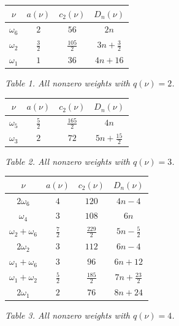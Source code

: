 \documentclass[11pt,reqno]{amsart}
\renewcommand{\arraystretch}{1.32}
\theoremstyle{definition}
\theoremstyle{remark}
\begin{document}
\begin{center}
\renewcommand{\arraystretch}{1.18}
\begin{tabular}{c|c|c|c}
$\nu$ & $a(\nu)$ & $c_2(\nu)$ & $D_n(\nu)$\\
\hline
$\omega_6$ & $2$ & $56$ & $2n$\\
$\omega_2$ & $\frac32$ & $\frac{105}{2}$
  & $3n+\frac32$\\
$\omega_1$ & $1$ & $36$ & $4n+16$
\end{tabular}
\par\smallskip
\textit{Table 1. All nonzero weights with $q(\nu)=2$.}
\end{center}

\begin{center}
\renewcommand{\arraystretch}{1.18}
\begin{tabular}{c|c|c|c}
$\nu$ & $a(\nu)$ & $c_2(\nu)$ & $D_n(\nu)$\\
\hline
$\omega_5$ & $\frac52$ & $\frac{165}{2}$ & $4n$\\
$\omega_3$ & $2$ & $72$ & $5n+\frac{15}{2}$
\end{tabular}
\par\smallskip
\textit{Table 2. All nonzero weights with $q(\nu)=3$.}
\end{center}

\begin{center}
\renewcommand{\arraystretch}{1.18}
\begin{tabular}{c|c|c|c}
$\nu$ & $a(\nu)$ & $c_2(\nu)$ & $D_n(\nu)$\\
\hline
$2\omega_6$ & $4$ & $120$ & $4n-4$\\
$\omega_4$ & $3$ & $108$ & $6n$\\
$\omega_2+\omega_6$ & $\frac72$ & $\frac{229}{2}$
  & $5n-\frac52$\\
$2\omega_2$ & $3$ & $112$ & $6n-4$\\
$\omega_1+\omega_6$ & $3$ & $96$ & $6n+12$\\
$\omega_1+\omega_2$ & $\frac52$ & $\frac{185}{2}$
  & $7n+\frac{23}{2}$\\
$2\omega_1$ & $2$ & $76$ & $8n+24$
\end{tabular}
\par\smallskip
\textit{Table 3. All nonzero weights with $q(\nu)=4$.}
\end{center}
\end{document}
